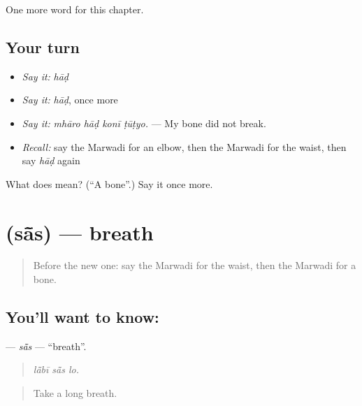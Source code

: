 \begin{grammarlens}[title={What you've built}]
One more word for this chapter.
\end{grammarlens}

\subsection*{Your turn}
\begin{itemize}
\raggedright
  \item \emph{Say it:} \emph{hāḍ}
  \item \emph{Say it:} \emph{hāḍ}, once more
  \item \emph{Say it:} \emph{mhāro hāḍ konī ṭūṭyo.} — My bone did not break.
  \item \emph{Recall:} say the Marwadi for an elbow, then the Marwadi for the waist, then say \emph{hāḍ} again
\end{itemize}

\begin{tcolorbox}[breakable,colback=teal!4,colframe=teal!35!black,title={Before you move on}]
What does  mean? (\textquotedblleft{}A bone\textquotedblright{}.) Say it once more.
\end{tcolorbox}
\section[\texorpdfstring{\mw{सांस} (sā̃s)}{सांस (sā̃s)}]{ (sā̃s) — breath}

\label{lesson:MW-C252-sas}



\begin{quote}
Before the new one: say the Marwadi for the waist, then the Marwadi for a bone.
\end{quote}

\subsection*{You'll want to know: }
\textbf{} — \emph{sā̃s} — \textquotedblleft{}breath\textquotedblright{}.

\begin{quote}
  
\end{quote}

\begin{quote}
\emph{lā̃bī sā̃s lo.}
\end{quote}

\begin{quote}
Take a long breath.
\end{quote}

